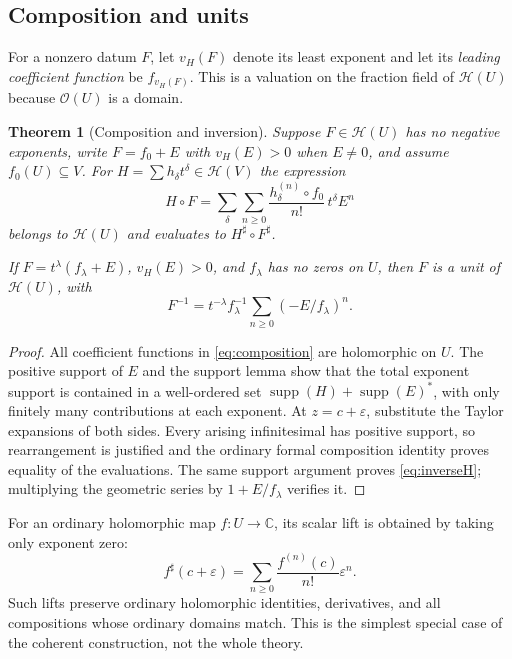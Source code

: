 \documentclass[11pt,letterpaper]{article}
\newtheorem{theorem}{Theorem}[section]
\theoremstyle{definition}
\theoremstyle{remark}
\newcommand{\C}{\mathbb C}
\newcommand{\OO}{\mathcal O}
\newcommand{\HH}{\mathcal H}
\newcommand{\supp}{\operatorname{supp}}
\newcommand{\sh}{^{\sharp}}
\numberwithin{equation}{section}
\begin{document}
\subsection{Composition and units}
For a nonzero datum $F$, let $v_H(F)$ denote its least exponent and let its \emph{leading coefficient function} be $f_{v_H(F)}$. This is a valuation on the fraction field of $\HH(U)$ because $\OO(U)$ is a domain.

\begin{theorem}[Composition and inversion]\label{thm:composition}
Suppose $F\in\HH(U)$ has no negative exponents, write $F=f_0+E$ with $v_H(E)>0$ when $E\ne0$, and assume $f_0(U)\subseteq V$. For $H=\sum h_\delta t^\delta\in\HH(V)$ the expression
\begin{equation}\label{eq:composition}
 H\circ F
 =\sum_{\delta}\sum_{n\ge0}
   \frac{h_\delta^{(n)}\circ f_0}{n!}\,t^\delta E^n
\end{equation}
belongs to $\HH(U)$ and evaluates to $H\sh\circ F\sh$.

If $F=t^\lambda(f_\lambda+E)$, $v_H(E)>0$, and $f_\lambda$ has no zeros on $U$, then $F$ is a unit of $\HH(U)$, with
\begin{equation}\label{eq:inverseH}
 F^{-1}=t^{-\lambda}f_\lambda^{-1}
       \sum_{n\ge0}(-E/f_\lambda)^n.
\end{equation}
\end{theorem}
\begin{proof}
All coefficient functions in \eqref{eq:composition} are holomorphic on $U$. The positive support of $E$ and the support lemma show that the total exponent support is contained in a well-ordered set $\supp(H)+\supp(E)^*$, with only finitely many contributions at each exponent. At $z=c+\varepsilon$, substitute the Taylor expansions of both sides. Every arising infinitesimal has positive support, so rearrangement is justified and the ordinary formal composition identity proves equality of the evaluations. The same support argument proves \eqref{eq:inverseH}; multiplying the geometric series by $1+E/f_\lambda$ verifies it.
\end{proof}
For an ordinary holomorphic map $f:U\to\C$, its scalar lift is obtained by taking only exponent zero:
\begin{equation}\label{eq:scalarlift}
 f\sh(c+\varepsilon)=\sum_{n\ge0}\frac{f^{(n)}(c)}{n!}\varepsilon^n.
\end{equation}
Such lifts preserve ordinary holomorphic identities, derivatives, and all compositions whose ordinary domains match. This is the simplest special case of the coherent construction, not the whole theory.
\end{document}
